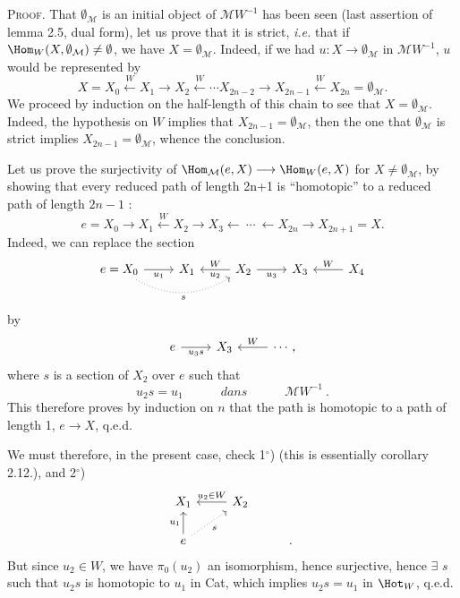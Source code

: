\textsc{Proof}. That $\emptyset_{\mathcal{M}}$ is an initial object of $\mathcal{M}W^{-1}$ has been seen (last assertion of lemma 2.5, dual form), let us prove that it is strict, \textit{i.e.} that if $\Hom_W(X,\emptyset_{\mathcal{M}})\neq\emptyset$, we have $X=\emptyset_{\mathcal{M}}$. Indeed, if we had $u : X\longrightarrow\emptyset_{\mathcal{M}}$ in $\mathcal{M}W^{-1}$, $u$ would be represented by
\[
X=X_0\xleftarrow{\ W\ }X_1\longrightarrow X_2\xleftarrow{\ W\ }\cdots X_{2n-2}\longrightarrow X_{2n-1}\xleftarrow{\ W\ }X_{2n}=\emptyset_{\mathcal{M}}.
\]
We proceed by induction on the half-length of this chain to see that $X=\emptyset_{\mathcal{M}}$. Indeed, the hypothesis on $W$ implies that $X_{2n-1}=\emptyset_{\mathcal{M}}$, then the one that $\emptyset_{\mathcal{M}}$ is strict implies
$X_{2n-1}=\emptyset_{\mathcal{M}}$, whence the conclusion. %

Let us prove the surjectivity of $\Hom_{\mathcal{M}}(e,X)\longrightarrow\Hom_W(e,X)$ for $X\neq\emptyset_{\mathcal{M}}$, by showing that every reduced path of length 2n+1 is ``homotopic'' to a reduced path of length $2n-1$ :
\[
e=X_0\longrightarrow X_1\xleftarrow{\ W\ }X_2\longrightarrow X_3\longleftarrow\ \cdots\ \longleftarrow X_{2n}\longrightarrow X_{2n+1}=X.
\]
Indeed, we can replace the section
\[
\begin{tikzcd}
e=X_0 \arrow[r,"u_1"'] \arrow[rr,dotted,bend right,"s"'] & X_1 & X_2 \arrow[l,"W"',"u_2"] \arrow[r,"u_3"'] & X_3 & X_4 \arrow[l,"W"']
\end{tikzcd}
\]
by
\[
\begin{tikzcd}
e \arrow[r,"u_3s"'] & X_3 & \cdots, \arrow[l,"W"']
\end{tikzcd}
\]
where $s$ is a section of $X_2$ over $e$ such that
\[
u_2s=u_1\qquad\quad\textit{dans}\qquad\quad\mathcal{M}W^{-1}\ .
\]
This therefore proves by induction on $n$ that the path is homotopic to a path of length 1, $e\longrightarrow X$, q.e.d.

We must therefore, in the present case, check 1$^{\circ}$) (this is essentially corollary 2.12.), and 2$^{\circ}$)
\[
\begin{tikzcd}
X_1 & X_2 \arrow[l,"u_2\in W"'] & \\
e \arrow[u,"u_1"] \arrow[ur,dotted,"s"'] & & .
\end{tikzcd}
\]
But since $u_2\in W$, we have $\pi_0(u_2)$ an isomorphism, hence
surjective, hence $\exists$ $s$ such that $u_2s$ is homotopic to $u_1$ in Cat, which implies $u_2s=u_1$ in $\Hot_W$, q.e.d.

